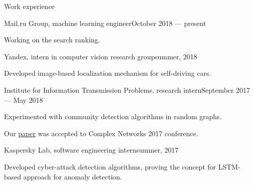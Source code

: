 \documentclass{resume} %
\begin{document}

\begin{rSection}{Work experience}

\begin{rSubsection}{Mail.ru Group, machine learning engineer}{October 2018 --- present} {} {}
\item Working on the search ranking.
\end{rSubsection}

\begin{rSubsection}{Yandex, intern in computer vision research group}{summer, 2018} {} {} 
\item Developed image-based localization mechanism for self-driving cars.
\end{rSubsection}

\begin{rSubsection}{Institute for Information Transmission Problems, research intern}{September 2017 --- May 2018} {} {}
\item Experimented with community detection algorithms in random graphs. 
\item Our \href{https://arxiv.org/abs/1707.01350}{\underline{paper}} was accepted to Complex Networks 2017 conference.
\end{rSubsection}

\begin{rSubsection}{Kaspersky Lab, software engineering intern}{summer, 2017} {} {}
\item Developed cyber-attack detection algorithms, proving the concept for LSTM-based approach for anomaly \mbox{detection}.

\end{rSubsection}

\end{rSection}
\end{document}

